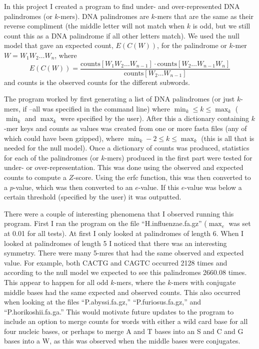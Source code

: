 \documentclass[11pt]{article}
\theoremstyle{definition}
\begin{document}
\pagestyle{fancy}

In this project I created a program to find under- and over-represented DNA palindromes (or $k$-mers).  DNA palindromes are $k$-mers that are the same as their reverse compliment (the middle letter will not match when $k$ is odd, but we still count this as a DNA palindrome if all other letters match).  We used the null model that gave an expected count, $E(C(W))$, for the palindrome or $k$-mer $W = W_1W_2 \ldots W_n$, where
\[ E(C(W)) = \frac{\text{counts}[W_1W_2 \ldots W_{n-1}] \cdot \text{counts}[W_2\ldots W_{n-1}W_n]}{\text{counts}[W_2\ldots W_{n-1}]} \]
and counts is the observed counts for the different subwords.

The program worked by first generating a list of DNA palindromes (or just $k$-mers, if --all was specified in the command line) where $\min_k \le k \le \max_k$ ($\min_k$ and $\max_k$ were specified by the user).  After this a dictionary containing $k$-mer keys and counts as values was created from one or more fasta files (any of which could have been gzipped), where $\min_k - 2 \le k \le \max_k$ (this is all that is needed for the null model).  Once a dictionary of counts was produced, statistics for each of the palindromes (or $k$-mers) produced in the first part were tested for under- or over-representation.  This was done using the observed and expected counts to compute a $Z$-score.  Using the erfc function, this was then converted to a $p$-value, which was then converted to an $e$-value.  If this $e$-value was below a certain threshold (specified by the user) it was outputted.

There were a couple of interesting phenomena that I observed running this program.  First I ran the program on the file ``H.influenzae.fa.gz'' ($\max_e$ was set at 0.01 for all tests).  At first I only looked at palindromes of length 6.  When I looked at palindromes of length 5 I noticed that there was an interesting symmetry.  There were many 5-mres that had the same observed and expected value.  For example, both CACTG and CAGTC occurred 2128 times and according to the null model we expected to see this palindromes 2660.08 times.  This appear to happen for all odd $k$-mers, where the $k$-mers with conjugate middle bases had the same expected and observed counts.  This also occurred when looking at the files ``P.abyssi.fa.gz,'' ``P.furiosus.fa.gz,'' and  ``P.horikoshii.fa.ga.''  This would motivate future updates to the program to include an option to merge counts for words with either a wild card base for all four nucleic bases, or perhaps to merge A and T bases into an S and C and G bases into a W, as this was observed when the middle bases were conjugates.
\end{document}
